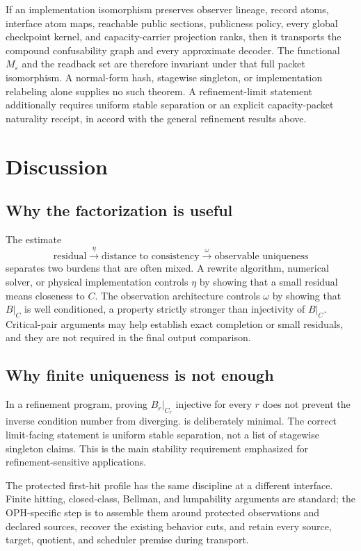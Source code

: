 \documentclass[11pt]{article}
\theoremstyle{definition}
\theoremstyle{remark}
\numberwithin{equation}{section}
\begin{document}
If an implementation isomorphism preserves observer lineage, record atoms,
interface atom maps, reachable public sections, publicness policy, every
global checkpoint kernel, and capacity-carrier projection ranks, then it
transports the compound confusability graph and every approximate decoder.
The functional \(M_\varepsilon\) and the readback set are therefore invariant
under that full packet isomorphism. A normal-form hash, stagewise singleton,
or implementation relabeling alone supplies no such theorem. A
refinement-limit statement additionally requires uniform stable separation or an explicit
capacity-packet naturality receipt, in accord with the general refinement
results above.

\section{Discussion}\label{sec:discussion}

\subsection{Why the factorization is useful}

The estimate
\[
 \text{residual}\xrightarrow{\ \eta\ }
 \text{distance to consistency}
 \xrightarrow{\ \omega\ }
 \text{observable uniqueness}
\]
separates two burdens that are often mixed.  A rewrite algorithm, numerical solver, or physical implementation controls $\eta$ by showing that a small residual means closeness to $C$.  The observation architecture controls $\omega$ by showing that $B|_C$ is well conditioned, a property strictly stronger than injectivity of $B|_C$.  Critical-pair arguments may help establish exact completion or small residuals, and they are not required in the final output comparison.

\subsection{Why finite uniqueness is not enough}

In a refinement program, proving $B_r|_{C_r}$ injective for every $r$ does not prevent the inverse condition number from diverging.   is deliberately minimal.  The correct limit-facing statement is uniform stable separation, not a list of stagewise singleton claims.  This is the main stability requirement emphasized for refinement-sensitive applications.

The protected first-hit profile has the same discipline at a different
interface.  Finite hitting, closed-class, Bellman, and lumpability arguments
are standard; the OPH-specific step is to assemble them around protected
observations and declared sources, recover the existing behavior cuts, and
retain every source, target, quotient, and scheduler premise during transport.
\end{document}
